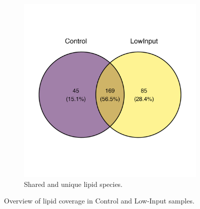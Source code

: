\documentclass[10pt,letterpaper]{article}
\begin{document}
\begin{figure}[htp]
  \vspace{1em}

  \begin{subfigure}[t]{0.55\textwidth}
    \centering
    \includegraphics[width=\linewidth]{fig/supp/SuppFig_3C_Lipid_Overlap_Venn}
    \caption{Shared and unique lipid species.}
    \label{fig:S3C}
  \end{subfigure}

  \caption{Overview of lipid coverage in Control and Low-Input samples.}
  \label{fig:S3}
\end{figure}
\end{document}
